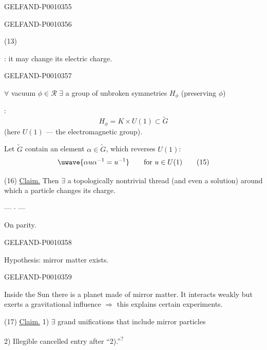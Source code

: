 \begin{GelfandAdjacentEvidence}{GELFAND-P001035}{5}

\end{GelfandAdjacentEvidence}
\begin{GelfandAdjacentEvidence}{GELFAND-P001035}{6}


(13) 

: it may change its electric charge.
\end{GelfandAdjacentEvidence}
\begin{GelfandAdjacentEvidence}{GELFAND-P001035}{7}


$\forall$ vacuum $\phi\in\mathcal R$ $\exists$ a group of unbroken symmetries $H_\phi$ (preserving $\phi$)

:
\begin{equation*}
H_\phi=K\times U(1)\subset\widetilde G
\tag{14}
\end{equation*}
(here $U(1)$ --- the electromagnetic group).

Let $\widetilde G$ contain an element $\alpha\in\widetilde G$, which reverses $U(1)$:
\begin{equation*}
\text{\uwave{\(\alpha u\alpha^{-1}=u^{-1}\)}}\qquad \text{for }u\in U(1)
\tag{15}
\end{equation*}

(16) \underline{Claim.} Then $\exists$ a topologically nontrivial thread (and even a solution) around which a particle changes its charge.

\begin{center}--- $\cdot$ ---\end{center}

On parity.
\end{GelfandAdjacentEvidence}
\begin{GelfandAdjacentEvidence}{GELFAND-P001035}{8}

Hypothesis: mirror matter exists.
\end{GelfandAdjacentEvidence}
\begin{GelfandAdjacentEvidence}{GELFAND-P001035}{9}


Inside the Sun there is a planet made of mirror matter. It interacts weakly but exerts a gravitational influence $\Rightarrow$ this explains certain experiments.

(17) \underline{Claim.} 1) $\exists$ grand unifications that include mirror particles

2) Illegible cancelled entry after “2).”\textsuperscript{?}
\end{GelfandAdjacentEvidence}
